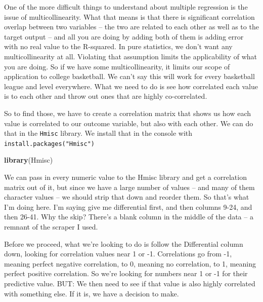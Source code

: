 \documentclass[]{book}
\newenvironment{Shaded}{\begin{snugshade}}{\end{snugshade}}
\newcommand{\DecValTok}[1]{\textcolor[rgb]{0.00,0.00,0.81}{#1}}
\newcommand{\KeywordTok}[1]{\textcolor[rgb]{0.13,0.29,0.53}{\textbf{#1}}}
\newcommand{\NormalTok}[1]{#1}
\newcommand{\OperatorTok}[1]{\textcolor[rgb]{0.81,0.36,0.00}{\textbf{#1}}}
\newcommand{\StringTok}[1]{\textcolor[rgb]{0.31,0.60,0.02}{#1}}
\begin{document}
One of the more difficult things to understand about multiple regression is the issue of multicollinearity. What that means is that there is significant correlation overlap between two variables -- the two are related to each other as well as to the target output -- and all you are doing by adding both of them is adding error with no real value to the R-squared. In pure statistics, we don't want any multicollinearity at all. Violating that assumption limits the applicability of what you are doing. So if we have some multicollinearity, it limits our scope of application to college basketball. We can't say this will work for every basketball league and level everywhere. What we need to do is see how correlated each value is to each other and throw out ones that are highly co-correlated.

So to find those, we have to create a correlation matrix that shows us how each value is correlated to our outcome variable, but also with each other. We can do that in the \texttt{Hmisc} library. We install that in the console with \texttt{install.packages("Hmisc")}

\begin{Shaded}
\begin{Highlighting}[]
\KeywordTok{library}\NormalTok{(Hmisc)}
\end{Highlighting}
\end{Shaded}

We can pass in every numeric value to the Hmisc library and get a correlation matrix out of it, but since we have a large number of values -- and many of them character values -- we should strip that down and reorder them. So that's what I'm doing here. I'm saying give me differential first, and then columns 9-24, and then 26-41. Why the skip? There's a blank column in the middle of the data -- a remnant of the scraper I used.

\begin{Shaded}
\end{Shaded}

Before we proceed, what we're looking to do is follow the Differential column down, looking for correlation values near 1 or -1. Correlations go from -1, meaning perfect negative correlation, to 0, meaning no correlation, to 1, meaning perfect positive correlation. So we're looking for numbers near 1 or -1 for their predictive value. BUT: We then need to see if that value is also highly correlated with something else. If it is, we have a decision to make.
\end{document}
